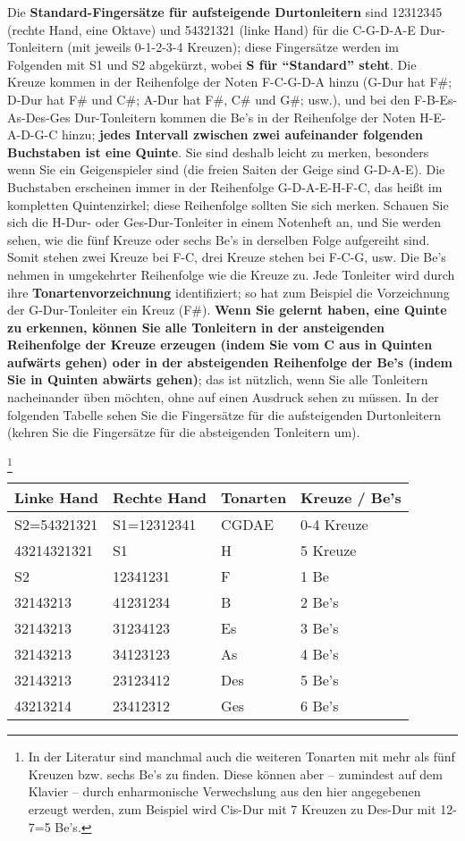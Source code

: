 Die \textbf{Standard-Fingersätze für aufsteigende Durtonleitern} sind 12312345 (rechte Hand, eine Oktave) und 54321321 (linke Hand) für die C-G-D-A-E Dur-Tonleitern (mit jeweils 0-1-2-3-4 Kreuzen); diese Fingersätze werden im Folgenden mit S1 und S2 abgekürzt, wobei \textbf{S für \enquote{Standard} steht}.
Die Kreuze kommen in der Reihenfolge der Noten F-C-G-D-A hinzu (G-Dur hat F\#; D-Dur hat F\# und C\#; A-Dur hat F\#, C\# und G\#; usw.), und bei den F-B-Es-As-Des-Ges Dur-Tonleitern kommen die Be's in der Reihenfolge der Noten H-E-A-D-G-C hinzu; \textbf{jedes Intervall zwischen zwei aufeinander folgenden Buchstaben ist eine Quinte}.
Sie sind deshalb leicht zu merken, besonders wenn Sie ein Geigenspieler sind (die freien Saiten der Geige sind G-D-A-E).
Die Buchstaben erscheinen immer in der Reihenfolge G-D-A-E-H-F-C, das heißt im kompletten Quintenzirkel; diese Reihenfolge sollten Sie sich merken.
Schauen Sie sich die H-Dur- oder Ges-Dur-Tonleiter in einem Notenheft an, und Sie werden sehen, wie die fünf Kreuze oder sechs Be's in derselben Folge aufgereiht sind.
Somit stehen zwei Kreuze bei F-C, drei Kreuze stehen bei F-C-G, usw.
Die Be's nehmen in umgekehrter Reihenfolge wie die Kreuze zu.
Jede Tonleiter wird durch ihre \textbf{Tonartenvorzeichnung} identifiziert; so hat zum Beispiel die Vorzeichnung der G-Dur-Tonleiter ein Kreuz (F\#).
\textbf{Wenn Sie gelernt haben, eine Quinte zu erkennen, können Sie alle Tonleitern in der ansteigenden Reihenfolge der Kreuze erzeugen (indem Sie vom C aus in Quinten aufwärts gehen) oder in der absteigenden Reihenfolge der Be's (indem Sie in Quinten abwärts gehen)}; das ist nützlich, wenn Sie alle Tonleitern nacheinander üben möchten, ohne auf einen Ausdruck sehen zu müssen.
In der folgenden Tabelle sehen Sie die Fingersätze für die aufsteigenden Durtonleitern (kehren Sie die Fingersätze für die absteigenden Tonleitern um).

\label{enharmonisch}\footnote{In der Literatur sind manchmal auch die weiteren Tonarten mit mehr als fünf Kreuzen bzw. sechs Be's zu finden.
Diese können aber -- zumindest auf dem Klavier -- durch enharmonische Verwechslung aus den hier angegebenen erzeugt werden, zum Beispiel wird Cis-Dur mit 7 Kreuzen zu Des-Dur mit 12-7=5 Be's.}

\begin{tabular}{l|l|l|l}
\label{tablemoll}
 Linke Hand & Rechte Hand & Tonarten & Kreuze / Be's \\ 
 \hline 
 S2=54321321 & S1=12312341 & CGDAE & 0-4 Kreuze \\ 
 43214321321 & S1 & H & 5 Kreuze \\ 
 S2 & 12341231 & F & 1 Be \\ 
 32143213 & 41231234 & B & 2 Be's \\ 
 32143213 & 31234123 & Es & 3 Be's \\ 
 32143213 & 34123123 & As & 4 Be's \\ 
 32143213 & 23123412 & Des & 5 Be's \\ 
 43213214 & 23412312 & Ges & 6 Be's \\ 
\end{tabular}

